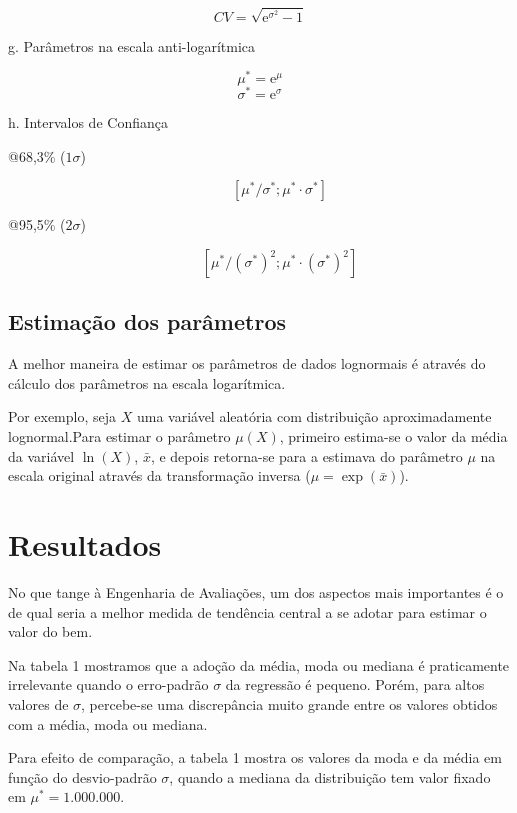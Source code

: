 \documentclass[final, xcolor={table}]{beamer}
\begin{document}
\begin{frame}[t]
\begin{multicols}{3}
$$CV = \sqrt{\mathrm{e}^{\sigma^2}-1}$$

g. Parâmetros na escala anti-logarítmica

$$\mu^* = \mathrm{e}^\mu$$
$$\sigma^* = \mathrm{e}^\sigma$$

h. Intervalos de Confiança

\begin{description}
  \item[@68,3\% ($1\sigma$)]
  $$[\mu^*/\sigma^*; \mu^* \cdot \sigma^*]$$
  \item[@95,5\% ($2\sigma$)]
  $$[\mu^*/(\sigma^*)^2; \mu^* \cdot (\sigma^*)^2]$$
\end{description}


\vfill\null
\columnbreak

\subsection{Estimação dos parâmetros}

A melhor maneira de estimar os parâmetros de dados lognormais é através do 
cálculo dos parâmetros na escala logarítmica.

Por exemplo, seja $X$ uma variável aleatória com distribuição aproximadamente 
lognormal.Para estimar o parâmetro $\mu(X)$, primeiro estima-se o valor da média 
da variável $\ln(X)$, $\bar{x}$, e depois retorna-se para a estimava do 
parâmetro $\mu$ na escala original através da transformação inversa 
($\mu = \exp(\bar{x})$).

\section{Resultados}

No que tange à Engenharia de Avaliações, um dos aspectos mais importantes é o de 
qual seria a melhor medida de tendência central a se adotar para estimar o valor 
do bem.

Na tabela 1 mostramos que a adoção da média, moda ou mediana é praticamente 
irrelevante quando o erro-padrão $\sigma$ da regressão é pequeno. Porém, para 
altos valores de $\sigma$, percebe-se uma discrepância muito grande entre os 
valores obtidos com a média, moda ou mediana.

Para efeito de comparação, a tabela 1 mostra os valores da moda e da média em 
função do desvio-padrão $\sigma$, quando a mediana da distribuição tem valor 
fixado em $\mu^* = 1.000.000$.


\end{multicols}
\end{frame}
\end{document}
